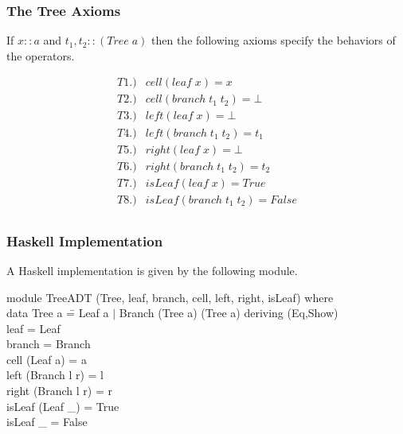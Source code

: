 \documentclass[11pt]{article}
\begin{document}
\subsubsection{The Tree Axioms}

If $x::a$ and $t_1,t_2 :: (Tree\; a)$ then the following axioms specify the
behaviors of the operators.

\[\begin{array}{ll}
T1.) & cell (leaf\; x) = x\\
T2.) & cell (branch \;t_1\; t_2) = \bot\\
T3.) & left(leaf\; x) = \bot\\
T4.) & left (branch \;t_1\; t_2) = t_1\\
T5.) & right(leaf\; x) = \bot\\
T6.) & right (branch \;t_1\; t_2) = t_2\\
T7.) & isLeaf (leaf\; x) = True\\
T8.) & isLeaf (branch \;t_1\; t_2) = False\\
\end{array}\]

\subsubsection{Haskell Implementation}

A Haskell implementation is given by the following module.

\begin{program**}
\>             module TreeADT (Tree, leaf, branch, cell, left, right, isLeaf) where \\
\>             data Tree a             \== Leaf a $\mid$ Branch (Tree a) (Tree a)  deriving (Eq,Show) \\
\>             leaf                    \>= Leaf \\
\>             branch                  \>= Branch \\
\>             cell  (Leaf a)          \>= a \\
\>             left  (Branch l r)      \>= l \\
\>             right (Branch l r)      \>= r \\
\>             isLeaf   (Leaf \_)      \>= True \\
\>             isLeaf   \_             \>= False \\
\end{program**}
\end{document}
